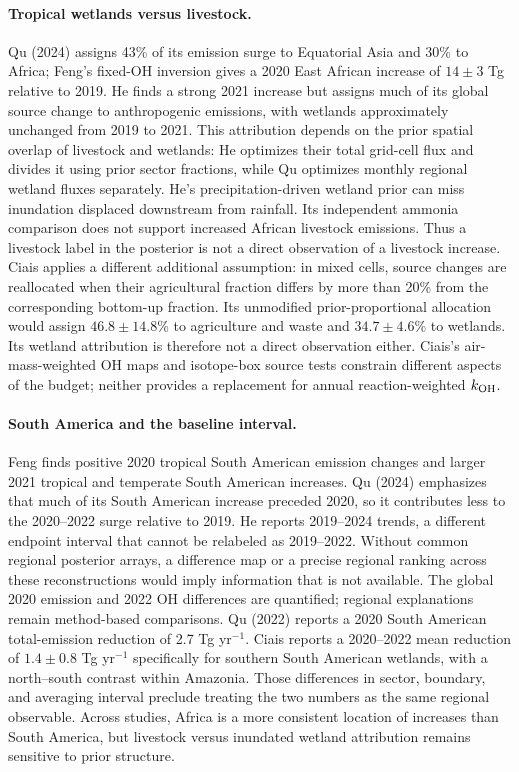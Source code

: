 \documentclass[11pt]{article}
\begin{document}
\paragraph{Tropical wetlands versus livestock.}
Qu (2024) assigns 43\% of its emission surge to Equatorial Asia and 30\% to Africa;
Feng's fixed-OH inversion gives a 2020 East African increase of
$14\pm3$ Tg relative to 2019. He finds a strong 2021 increase but assigns
much of its global source change to anthropogenic emissions, with wetlands
approximately unchanged from 2019 to 2021. This attribution depends on the
prior spatial overlap of livestock and wetlands: He optimizes their total
grid-cell flux and divides it using prior sector fractions, while Qu
optimizes monthly regional wetland fluxes separately. He's precipitation-driven
wetland prior can miss inundation displaced downstream from rainfall. Its
independent ammonia comparison does not support increased African livestock
emissions. Thus a livestock label in the posterior is not a direct
observation of a livestock increase.
Ciais applies a different additional assumption: in mixed cells, source
changes are reallocated when their agricultural fraction differs by more than
20\% from the corresponding bottom-up fraction. Its unmodified
prior-proportional allocation would assign $46.8\pm14.8$\% to agriculture
and waste and $34.7\pm4.6$\% to wetlands. Its wetland attribution is therefore
not a direct observation either. Ciais's air-mass-weighted OH maps and
isotope-box source tests constrain different aspects of the budget; neither
provides a replacement for annual reaction-weighted $k_{\rm OH}$.

\paragraph{South America and the baseline interval.}
Feng finds positive 2020 tropical South American emission changes and larger
2021 tropical and temperate South American increases. Qu (2024) emphasizes that
much of its South American increase preceded 2020, so it contributes less
to the 2020--2022 surge relative to 2019. He reports 2019--2024 trends, a
different endpoint interval that cannot be relabeled as 2019--2022. Without
common regional posterior arrays, a difference map or a precise regional
ranking across these reconstructions would imply information that is not
available. The global 2020 emission and 2022 OH differences are quantified;
regional explanations remain method-based comparisons.
Qu (2022) reports a 2020 South American total-emission reduction of
2.7 Tg yr$^{-1}$. Ciais reports a 2020--2022 mean reduction of
$1.4\pm0.8$ Tg yr$^{-1}$ specifically for southern South American wetlands,
with a north--south contrast within Amazonia. Those differences in sector,
boundary, and averaging interval preclude treating the two numbers as the
same regional observable. Across studies, Africa is a more consistent
location of increases than South America, but livestock versus inundated
wetland attribution remains sensitive to prior structure.
\end{document}

